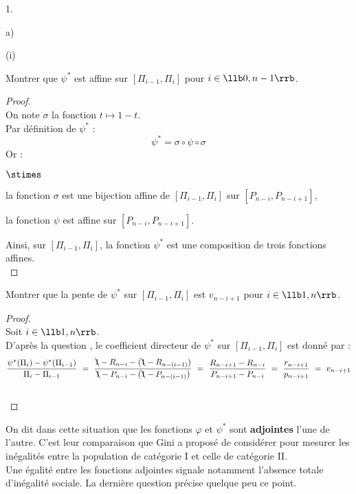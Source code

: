 \documentclass[11pt]{article}%
\begin{document}
\begin{noliste}{1.}
\begin{noliste}{a)}
\begin{nonoliste}{(i)}
   
   \item Montrer que $\psi^*$ est affine sur $[\Pi_{i-1}, \Pi_i]$ pour 
   $i \in \llb 0,n-1 \rrb$. 
   
   \begin{proof}~\\
     On note $\sigma$ la fonction $t\mapsto 1 - t$.\\
     Par définition de $\psi^*$ : 
     \[
      \psi^* = \sigma \circ \psi \circ \sigma
     \]
     Or : 
     \begin{noliste}{$\stimes$}
     \item la fonction $\sigma$ est une bijection affine de 
      $[\Pi_{i-1},\Pi_i]$ sur $[P_{n-i},P_{n-i+1}]$, 
     \item la fonction $\psi$ est affine sur $[P_{n-i}, P_{n-i+1}]$. 
     \end{noliste}
     Ainsi, sur $[\Pi_{i-1},\Pi_i]$, la fonction $\psi^*$ est une 
     composition de trois fonctions affines.
     ~\\[-1cm]
   \end{proof}

   
   \item Montrer que la pente de $\psi^*$ sur $[\Pi_{i-1}, \Pi_i]$ est 
   $v_{n-i+1}$ pour $i \in \llb 1,n \rrb$. 
   
   \begin{proof}~\\
     Soit $i \in \llb 1,n \rrb$.\\
    D'après la question , le coefficient directeur de 
    $\psi^*$ sur $[\Pi_{i-1},
    \Pi_i]$ est donné par :
    \[
      \dfrac{\psi^*(\Pi_i)-\psi^*(\Pi_{i-1})}{\Pi_i - \Pi_{i-1}} \ = \ 
      \dfrac{\bcancel{1}-R_{n-i}-(\bcancel{1}-R_{n-(i-1)})}
      {\bcancel{1}-P_{n-i}-(\bcancel{1}-P_{n-(i-1)})} \ = \
      \dfrac{R_{n-i+1}-R_{n-i}}{P_{n-i+1}-P_{n-i}}
      \ = \ \dfrac{r_{n-i+1}}{p_{n-i+1}} \ = \ v_{n-i+1}
    \]
    ~\\[-1cm]
   \end{proof}
  \end{nonoliste}

  \noindent
  On dit dans cette situation que les fonctions $\varphi$ et $\psi^*$ 
  sont \textbf{adjointes} l'une de l'autre. C'est leur comparaison que 
  Gini a proposé de considérer pour \og mesurer les inégalités \fg{} 
  entre la population de catégorie I et celle de catégorie II. \\
  Une égalité entre les fonctions adjointes signale notamment l'absence 
  totale d'inégalité sociale. La dernière question précise quelque peu 
  ce point. 
 \end{noliste}
 

\end{noliste}
\end{document}
